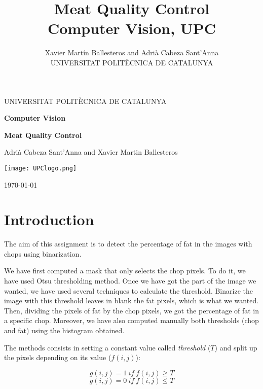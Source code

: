 \documentclass[12]{article}
\author{Xavier Martín Ballesteros and Adrià Cabeza Sant'Anna \\ \small UNIVERSITAT POLITÈCNICA DE CATALUNYA}
\title{Meat Quality Control \\ \large{Computer Vision, UPC}}
\begin{document}

\begin{titlepage}
	\centering
	\vspace{1cm}
	{\scshape\Large UNIVERSITAT POLITÈCNICA DE CATALUNYA\par}
	\vspace{1.5cm}
	{\huge\bfseries Computer Vision \par}
	\vspace{2cm}
	{\Large \textbf{Meat Quality Control}\par}
	\vspace{0.2cm}
	{\Large Adrià Cabeza Sant'Anna and Xavier Martin Ballesteros\break \par}
	
	\vspace*{\fill}
	\texttt{[image: UPClogo.png]}\par\vspace{1cm}

	{\large \today}
\end{titlepage}

\newpage
\tableofcontents

\section{Introduction}
The aim of this assignment is to detect the percentage of fat in the images with chops using binarization.

We have first computed a mask that only selects the chop pixels. To do it, we have used Otsu thresholding method. Once we have got the part of the image we wanted, we have used several  techniques to calculate the threshold. Binarize the image with this threshold leaves in blank the fat pixels, which is what we wanted. Then, dividing the pixels of fat by the chop pixels, we got the percentage of fat in a specific chop. Moreover, we have also computed manually both thresholds (chop and fat) using the histogram obtained.

The methods consists in setting a constant value called \textit{threshold} ($T$) and split up the pixels depending on its value ($ f(i,j)$):
\vspace{-0.6cm}
\begin{center}
$$ g(i,j)=1\ if\ f(i,j) \geq T$$ 
$$ g(i,j)=0\ if\ f(i,j) \leq T$$
\end{center}
\end{document}
